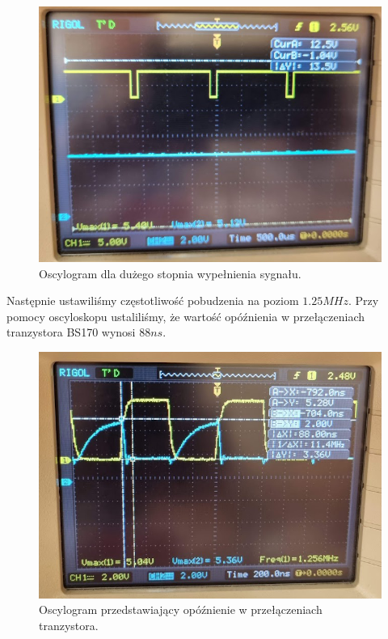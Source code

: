 \documentclass[polish,polish,a4paper]{article}
\begin{document}
\begin{figure}[H]
\centering
\includegraphics[width=1.0\textwidth]{oscylogram duze wypelnienie.png}
\caption{Oscylogram dla dużego stopnia wypełnienia sygnału.}
\end{figure}

Następnie ustawiliśmy częstotliwość pobudzenia na poziom $1.25 MHz$. Przy pomocy oscyloskopu ustaliliśmy, że wartość opóźnienia w przełączeniach tranzystora BS170 wynosi $88ns$.

\begin{figure}[H]
\centering
\includegraphics[width=1.0\textwidth]{oscylogram opoznienie.png}
\caption{Oscylogram przedstawiający opóźnienie w przełączeniach tranzystora.}
\end{figure}
\end{document}
